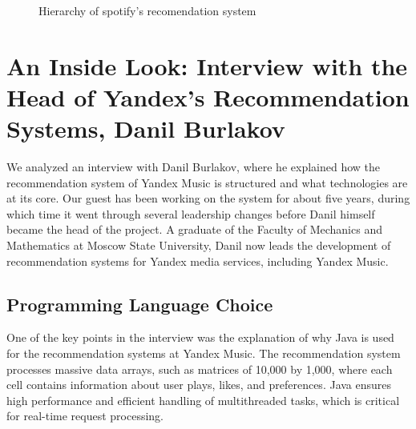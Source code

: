 \documentclass[12pt,a4paper]{article}
\begin{document}
\begin{figure}
\begin{center}
\end{center}
\caption{Hierarchy of spotify's recomendation system}
\label{Schema 2}
\end{figure}

\section{An Inside Look: Interview with the Head of Yandex's Recommendation Systems, Danil Burlakov}

    We analyzed an interview with Danil Burlakov, where he explained how the recommendation system of Yandex Music is structured and what technologies are at its core. Our guest has been working on the system for about five years, during which time it went through several leadership changes before Danil himself became the head of the project. A graduate of the Faculty of Mechanics and Mathematics at Moscow State University, Danil now leads the development of recommendation systems for Yandex media services, including Yandex Music\citep{YandexI}.

\subsection{Programming Language Choice}

One of the key points in the interview was the explanation of why Java is used for the recommendation systems at Yandex Music. The recommendation system processes massive data arrays, such as matrices of 10,000 by 1,000, where each cell contains information about user plays, likes, and preferences. Java ensures high performance and efficient handling of multithreaded tasks, which is critical for real-time request processing\citep{YT}.
\end{document}
